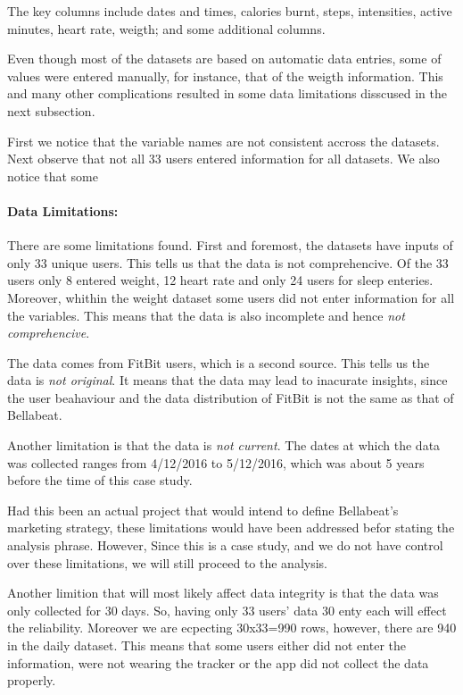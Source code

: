 \documentclass[
]{article}
\begin{document}
The key columns include dates and times, calories burnt, steps,
intensities, active minutes, heart rate, weigth; and some additional
columns.

Even though most of the datasets are based on automatic data entries,
some of values were entered manually, for instance, that of the weigth
information. This and many other complications resulted in some data
limitations disscused in the next subsection.

First we notice that the variable names are not consistent accross the
datasets. Next observe that not all 33 users entered information for all
datasets. We also notice that some

\hypertarget{data-limitations}{%
\paragraph{Data Limitations:}\label{data-limitations}}

There are some limitations found. First and foremost, the datasets have
inputs of only 33 unique users. This tells us that the data is not
comprehencive. Of the 33 users only 8 entered weight, 12 heart rate and
only 24 users for sleep enteries. Moreover, whithin the weight dataset
some users did not enter information for all the variables. This means
that the data is also incomplete and hence \emph{not comprehencive}.

The data comes from FitBit users, which is a second source. This tells
us the data is \emph{not original}. It means that the data may lead to
inacurate insights, since the user beahaviour and the data distribution
of FitBit is not the same as that of Bellabeat.

Another limitation is that the data is \emph{not current}. The dates at
which the data was collected ranges from 4/12/2016 to 5/12/2016, which
was about 5 years before the time of this case study.

Had this been an actual project that would intend to define Bellabeat's
marketing strategy, these limitations would have been addressed befor
stating the analysis phrase. However, Since this is a case study, and we
do not have control over these limitations, we will still proceed to the
analysis.

Another limition that will most likely affect data integrity is that the
data was only collected for 30 days. So, having only 33 users' data 30
enty each will effect the reliability. Moreover we are ecpecting
30x33=990 rows, however, there are 940 in the daily dataset. This means
that some users either did not enter the information, were not wearing
the tracker or the app did not collect the data properly.
\end{document}
